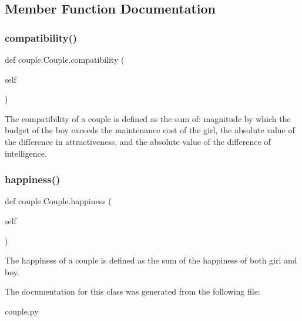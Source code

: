 \subsection{Member Function Documentation}
\mbox{\label{classcouple_1_1_couple_a1752d35bbc3da6524676374511693988}} 
\subsubsection{\texorpdfstring{compatibility()}{compatibility()}}
{\footnotesize\ttfamily def couple.\+Couple.\+compatibility (\begin{DoxyParamCaption}\item[{}]{self }\end{DoxyParamCaption})}

\begin{DoxyVerb}The compatibility of a couple is defined as the sum of: magnitude by which the budget of the boy exceeds the maintenance cost of the girl, the absolute value of the difference in attractiveness, and the absolute value of the difference of intelligence.\end{DoxyVerb}
 \mbox{\label{classcouple_1_1_couple_ab7ac98ab6a0dd03bf75790f949cb0c90}} 
\subsubsection{\texorpdfstring{happiness()}{happiness()}}
{\footnotesize\ttfamily def couple.\+Couple.\+happiness (\begin{DoxyParamCaption}\item[{}]{self }\end{DoxyParamCaption})}

\begin{DoxyVerb}The happiness of a couple is defined as the sum of the happiness of both girl and boy.
\end{DoxyVerb}
 

The documentation for this class was generated from the following file\+:\begin{DoxyCompactItemize}
\item 
couple.\+py\end{DoxyCompactItemize}
